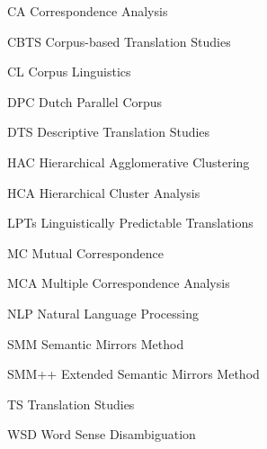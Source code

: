 CA      Correspondence Analysis



CBTS    Corpus-based Translation Studies



CL      Corpus Linguistics



DPC      Dutch Parallel Corpus



DTS      Descriptive Translation Studies



HAC      Hierarchical Agglomerative Clustering



HCA      Hierarchical Cluster Analysis



LPTs      Linguistically Predictable Translations



MC      Mutual Correspondence



MCA    Multiple Correspondence Analysis



NLP      Natural Language Processing



SMM    Semantic Mirrors Method



SMM++    Extended Semantic Mirrors Method



TS      Translation Studies



WSD      Word Sense Disambiguation

